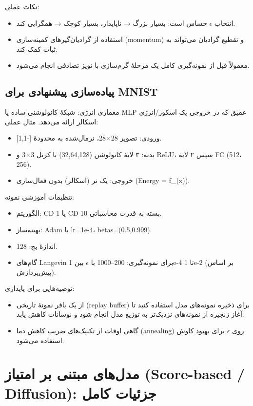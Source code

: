 نکات عملی:
\begin{itemize}
    \item انتخاب \(\epsilon\) حساس است: بسیار بزرگ → ناپایدار، بسیار کوچک → همگرایی کند.
    \item استفاده از گرادیان‌گیرهای کمینه‌سازی (momentum) و تقطیع گرادیان می‌تواند به ثبات کمک کند.
    \item معمولاً قبل از نمونه‌گیری کامل یک مرحلهٔ گرم‌سازی با نویز تصادفی انجام می‌شود.
\end{itemize}

\subsection{پیاده‌سازی پیشنهادی برای MNIST}
معماری انرژی: شبکهٔ کانولوشنی ساده یا MLP عمیق که در خروجی یک اسکور/انرژی اسکالر ارائه می‌دهد. مثال عملی:
\begin{itemize}
    \item ورودی: تصویر 28×28، نرمال‌شده به محدودهٔ [-1,1].
    \item بدنه: ۳ لایهٔ کانولوشن (32,64,128) با کرنل 3×3 و ReLU، سپس ۲ لایهٔ FC (512، 256).
    \item خروجی: یک نر (اسکالر) بدون فعال‌سازی (Energy = f_\theta(x)).
\end{itemize}

تنظیمات آموزشی نمونه:
\begin{itemize}
    \item الگوریتم: CD-1 یا CD-10 بسته به قدرت محاسباتی.
    \item بهینه‌ساز: Adam با lr=1e-4، betas=(0.5,0.999).
    \item اندازهٔ بچ: 128.
    \item گام‌های Langevin برای نمونه‌گیری: 200–1000 با \(\epsilon\) بین 1e-4 تا 1e-2 (بر اساس پیش‌پردازش).
\end{itemize}

توصیه‌هایی برای پایداری:
\begin{itemize}
    \item از یک بافر نمونهٔ تاریخی (replay buffer) برای ذخیره نمونه‌های مدل استفاده کنید تا آغاز زنجیره از نمونه‌های نزدیک‌تر به توزیع مدل انجام شود و نوسانات کاهش یابد.
    \item گاهی اوقات از تکنیک‌های ضریب کاهش دما (annealing) روی \(\epsilon\) برای بهبود کاوش استفاده می‌شود.
\end{itemize}

\section{مدل‌های مبتنی بر امتیاز (Score-based / Diffusion): جزئیات کامل}

